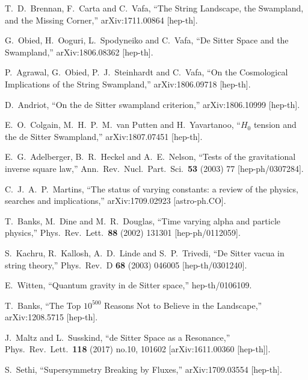 \documentclass[11pt,a4paper]{article}
\begin{document}
\begin{itemize}
\begin{thebibliography}{99}
  T.~D.~Brennan, F.~Carta and C.~Vafa,
  ``The String Landscape, the Swampland, and the Missing Corner,''
  arXiv:1711.00864 [hep-th].

  G.~Obied, H.~Ooguri, L.~Spodyneiko and C.~Vafa,
  ``De Sitter Space and the Swampland,''
  arXiv:1806.08362 [hep-th].

  P.~Agrawal, G.~Obied, P.~J.~Steinhardt and C.~Vafa,
  ``On the Cosmological Implications of the String Swampland,''
  arXiv:1806.09718 [hep-th].

  D.~Andriot,
  ``On the de Sitter swampland criterion,''
  arXiv:1806.10999 [hep-th].

  E.~O.~Colgain, M.~H.~P.~M.~van Putten and H.~Yavartanoo,
  ``$H_0$ tension and the de Sitter Swampland,''
  arXiv:1807.07451 [hep-th].

  E.~G.~Adelberger, B.~R.~Heckel and A.~E.~Nelson,
  ``Tests of the gravitational inverse square law,''
  Ann.\ Rev.\ Nucl.\ Part.\ Sci.\  {\bf 53} (2003) 77
  [hep-ph/0307284].

  C.~J.~A.~P.~Martins,
  ``The status of varying constants: a review of the physics, searches and implications,''
  arXiv:1709.02923 [astro-ph.CO].

  T.~Banks, M.~Dine and M.~R.~Douglas,
  ``Time varying alpha and particle physics,''
  Phys.\ Rev.\ Lett.\  {\bf 88} (2002) 131301
  [hep-ph/0112059].

  S.~Kachru, R.~Kallosh, A.~D.~Linde and S.~P.~Trivedi,
  ``De Sitter vacua in string theory,''
  Phys.\ Rev.\ D {\bf 68} (2003) 046005
  [hep-th/0301240].

  E.~Witten,
  ``Quantum gravity in de Sitter space,''
  hep-th/0106109.

  T.~Banks,
  ``The Top $10^{500}$ Reasons Not to Believe in the Landscape,''
  arXiv:1208.5715 [hep-th].

  J.~Maltz and L.~Susskind,
  ``de Sitter Space as a Resonance,''
  Phys.\ Rev.\ Lett.\  {\bf 118} (2017) no.10,  101602
  [arXiv:1611.00360 [hep-th]].

  S.~Sethi,
  ``Supersymmetry Breaking by Fluxes,''
  arXiv:1709.03554 [hep-th].


\end{thebibliography}
\end{itemize}
\end{document}
